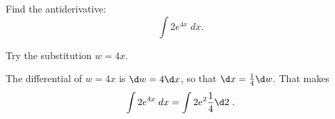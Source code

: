 \documentclass{ximera}
\author{Emma Smith Zbarsky\and Nela Lakos \and Bobby Ramsey}
\begin{document}
\begin{exercise}

Find the antiderivative: \[\int 2e^{4x}\; dx.\]


\begin{hint}
	Try the substitution $w=4x$.
\end{hint}


\begin{hint}
	The differential of $w=4x$ is $\d w = 4\d x$, so that $\d x=\frac{1}{4}\d w$. That makes
	\[\int 2e^{4x}\; dx=\int 2e^{2}\frac{1}{4}\d 2\;.\]
\end{hint}


\begin{multipleChoice}
\end{multipleChoice}

\end{exercise}
\end{document}
